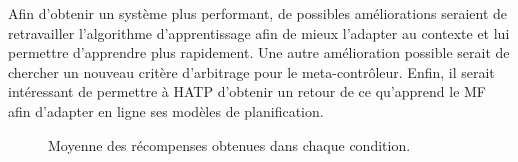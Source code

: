 \documentclass[english,a4paper,11pt,twoside]{StyleThese}
\begin{document}
Afin d'obtenir un système plus performant, de possibles améliorations seraient de retravailler l'algorithme d'apprentissage afin de mieux l'adapter au contexte et lui permettre d'apprendre plus rapidement. Une autre amélioration possible serait de chercher un nouveau critère d'arbitrage pour le meta-contrôleur. Enfin, il serait intéressant de permettre à HATP d'obtenir un retour de ce qu'apprend le MF afin d'adapter en ligne ses modèles de planification.


\begin{figure}[!h]
\centering
	\hfill
    \caption{Moyenne des récompenses obtenues dans chaque condition.}
    \label{fig:resultsFirstTask}
\end{figure}
\end{document}
